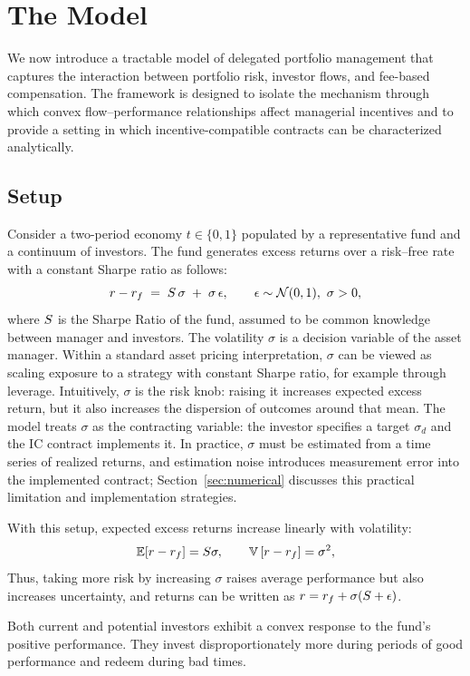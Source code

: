\section{The Model}
\label{sec:environment}

We now introduce a tractable model of delegated portfolio management that captures the interaction between portfolio risk, investor flows, and fee-based compensation. The framework is designed to isolate the mechanism through which convex flow--performance relationships affect managerial incentives and to provide a setting in which incentive-compatible contracts can be characterized analytically.

\subsection{Setup}
Consider a two-period economy $t\in\{0,1\}$ populated by a representative fund and a continuum of investors. The fund generates excess returns over a risk--free rate with a constant Sharpe ratio as follows:
\begin{equation}
    r-r_f \;=\; S\,\sigma \;+\; \sigma\,\epsilon,
    \qquad \epsilon \sim \mathcal{N}(0,1),\ \sigma>0,
\end{equation}
where \(S\) is the Sharpe Ratio of the fund, assumed to be common knowledge between manager and investors. The volatility $\sigma$ is a decision variable of the asset manager. Within a standard asset pricing interpretation, $\sigma$ can be viewed as scaling exposure to a strategy with constant Sharpe ratio, for example through leverage.
Intuitively, $\sigma$ is the risk knob: raising it increases expected excess return, but it also increases the dispersion of outcomes around that mean. The model treats $\sigma$ as the contracting variable: the investor specifies a target $\sigma_d$ and the IC contract implements it. In practice, $\sigma$ must be estimated from a time series of realized returns, and estimation noise introduces measurement error into the implemented contract; Section~\ref{sec:numerical} discusses this practical limitation and implementation strategies.

With this setup, expected excess returns increase linearly with volatility:
\[
\mathbb{E}[r-r_f]=S \sigma,\qquad {\mathbb{V}}\,[r-r_f]=\sigma^2,
\]
Thus, taking more risk by increasing $\sigma$ raises average performance but also increases uncertainty, and returns can be written as $r=r_f+\sigma(S+\epsilon)$.

Both current and potential investors exhibit a convex response to the fund's positive performance. They invest disproportionately more during periods of good performance and redeem during bad times.

